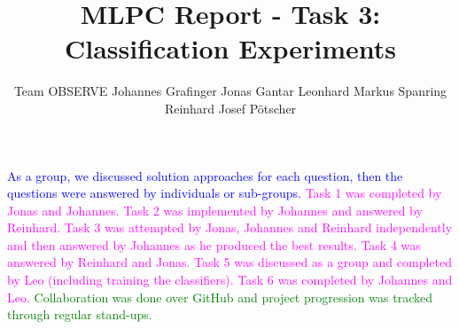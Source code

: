 \documentclass{article}
\title{MLPC Report  - Task 3: Classification Experiments}
\author{
  Team OBSERVE \AND
  Johannes Grafinger 
  \And
  Jonas Gantar 
  \And 
  Leonhard Markus Spanring 
  \And 
  Reinhard Josef Pötscher
}
\begin{document}
\maketitle

\begin{contributions}
  \textcolor{blue}{As a group, we discussed solution approaches for each question, then the questions were answered by individuals or sub-groups.} 
  \textcolor{magenta}{Task 1 was completed by Jonas and Johannes. Task 2 was implemented by Johannes and answered by Reinhard. Task 3 was attempted by Jonas, Johannes and Reinhard independently and then answered by Johannes as he produced the best results. Task 4 was answered by Reinhard and Jonas. Task 5 was discussed as a group and completed by Leo (including training the classifiers). Task 6 was completed by Johannes and Leo.} 
  \textcolor{green}{Collaboration was done over GitHub and project progression was tracked through regular stand-ups.} 
\end{contributions}












\end{document}
